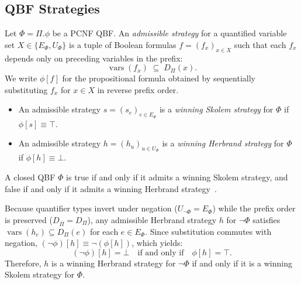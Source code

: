 \documentclass[runningheads]{llncs}
\DeclareMathOperator{\vars}{vars}
\begin{document}
\subsection{QBF Strategies}
\label{subsec:strategies}

\begin{definition}[Strategies]
    \label{def:strategies}
    Let $\Phi = \Pi.\phi$ be a PCNF QBF.
    An \emph{admissible strategy} for a quantified variable set $X \in \{E_\Phi, U_\Phi\}$ is a tuple of Boolean formulas $f = (f_x)_{x \in X}$ such that each $f_x$ depends only on preceding variables in the prefix:
    \begin{equation}
        \vars(f_x) \;\subseteq\; D_\Pi(x) .
    \end{equation}
    We write $\phi[f]$ for the propositional formula obtained by sequentially substituting $f_x$ for $x \in X$ in reverse prefix order.
    \begin{itemize}
        \item An admissible strategy $s = (s_e)_{e \in E_\Phi}$ is a \emph{winning Skolem strategy} for $\Phi$ if $\phi[s] \equiv \top$.
        \item An admissible strategy $h = (h_u)_{u \in U_\Phi}$ is a \emph{winning Herbrand strategy} for $\Phi$ if $\phi[h] \equiv \bot$.
    \end{itemize}
\end{definition}

A closed QBF $\Phi$ is true if and only if it admits a winning Skolem strategy, and false if and only if it admits a winning Herbrand strategy~\cite{beyersdorff2021qbf}.

\begin{remark}
    \label{rem:duality}
    Because quantifier types invert under negation ($U_{\neg\Phi} = E_\Phi$) while the prefix order is preserved ($D_{\overline{\Pi}} = D_\Pi$), any admissible Herbrand strategy $h$ for $\neg\Phi$ satisfies $\vars(h_e) \subseteq D_\Pi(e)$ for each $e \in E_\Phi$.
    Since substitution commutes with negation, $(\neg\phi)[h] \equiv \neg(\phi[h])$, which yields:
    \begin{equation}
        (\neg\phi)[h] = \bot \quad \text{if and only if} \quad \phi[h] = \top .
        \label{eq:strategy-duality}
    \end{equation}
    Therefore, $h$ is a winning Herbrand strategy for $\neg\Phi$ if and only if it is a winning Skolem strategy for $\Phi$.
\end{remark}
\end{document}
